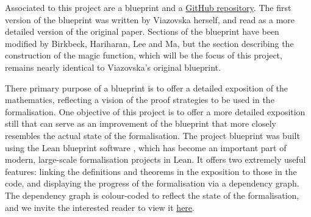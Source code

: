 Associated to this project are a blueprint \cite{blueprint} and a \href{https://github.com/thefundamentaltheor3m/Sphere-Packing-Lean}{GitHub repository}. The first version of the blueprint was written by Viazovska herself, and read as a more detailed version of the original paper. Sections of the blueprint have been modified by Birkbeck, Hariharan, Lee and Ma, but the section describing the construction of the magic function, which will be the focus of this project, remains nearly identical to Viazovska's original blueprint.

There primary purpose of a blueprint is to offer a detailed exposition of the mathematics, reflecting a vision of the proof strategies to be used in the formalisation. One objective of this project is to offer a more detailed exposition still that can serve as an improvement of the blueprint that more closely resembles the actual state of the formalisation. The project blueprint was built using the Lean blueprint software \cite{Leanblueprint}, which has become an important part of modern, large-scale formalisation projects in Lean. It offers two extremely useful features: linking the definitions and theorems in the exposition to those in the code, and displaying the progress of the formalisation via a dependency graph. The dependency graph is colour-coded to reflect the state of the formalisation, and we invite the interested reader to view it \href{https://thefundamentaltheor3m.github.io/Sphere-Packing-Lean/blueprint/dep_graph_document.html}{here}.